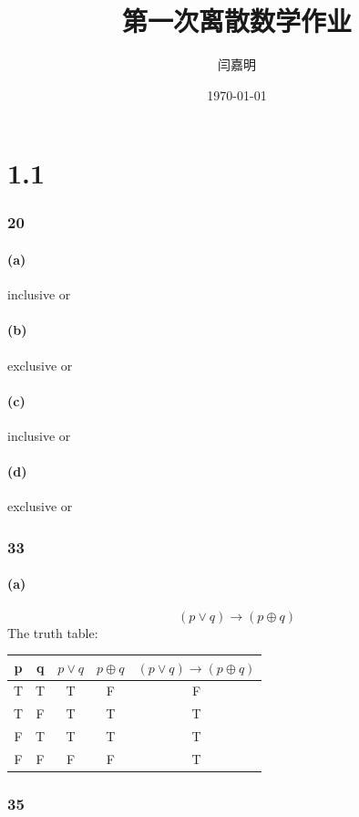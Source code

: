 \documentclass[UTF8]{ctexart}
\title{\heiti 第一次离散数学作业}
\author{\kaishu 闫嘉明}
\date{\today}
\begin{document}
\maketitle
\part{1.1}
\section{20}
\subsection{(a)}
inclusive or

\subsection{(b)}
exclusive or

\subsection{(c)}
inclusive or

\subsection{(d)}
exclusive or

\section{33}
\subsection{(a)}
$$(p \vee q) \to (p \oplus q)$$
The truth table:\\

\begin{tabular}{|c|c|c|c|c|}
    \hline
    p & q & $p \vee q$ & $p \oplus q$ & $(p \vee q) \to (p \oplus q)$\\
    \hline
    T & T & T & F & F\\
    \hline
    T & F & T & T & T\\
    \hline
    F & T & T & T & T\\
    \hline
    F & F & F & F & T\\
    \hline
    
\end{tabular}
\section{35}
\end{document}
